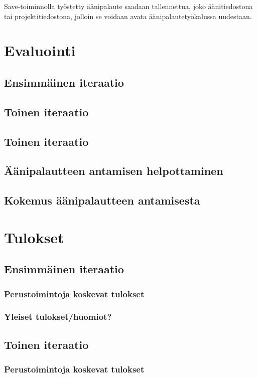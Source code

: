 \documentclass[utf8]{gradu3}
\begin{document}
Save-toiminnolla työstetty äänipalaute saadaan tallennettua, joko äänitiedostona tai projektitiedostona, jolloin se voidaan avata äänipalautetyökalussa uudestaan.

%

\chapter{Evaluointi}

\section{Ensimmäinen iteraatio}
\section{Toinen iteraatio}
\section{Toinen iteraatio}

\section{Äänipalautteen antamisen helpottaminen}
\section{Kokemus äänipalautteen antamisesta}

%

\chapter{Tulokset}
\section{Ensimmäinen iteraatio}
\subsection{Perustoimintoja koskevat tulokset}
\subsection{Yleiset tulokset/huomiot?}

\section{Toinen iteraatio}
\subsection{Perustoimintoja koskevat tulokset}
\end{document}
